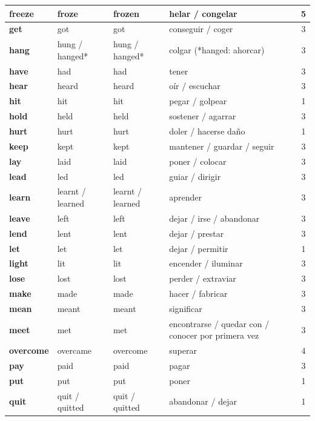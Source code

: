 \documentclass[11pt,a4paper]{article}
\begin{document}
\begin{longtable}{|>{\bfseries}p{2.6cm}|p{3.4cm}|p{3.6cm}|>{\raggedright\arraybackslash}p{6.0cm}|c|}
\rowcolor{rojoC} freeze & froze & frozen & helar / congelar & 5\\ \hline
\rowcolor{verdeC} get & got & got & conseguir / coger & 3\\ \hline
\rowcolor{verdeC} hang & hung / hanged* & hung / hanged* & colgar (*hanged: ahorcar) & 3\\ \hline
\rowcolor{verdeC} have & had & had & tener & 3\\ \hline
\rowcolor{verdeC} hear & heard & heard & oír / escuchar & 3\\ \hline
\rowcolor{amarilloC} hit & hit & hit & pegar / golpear & 1\\ \hline
\rowcolor{verdeC} hold & held & held & sostener / agarrar & 3\\ \hline
\rowcolor{amarilloC} hurt & hurt & hurt & doler / hacerse daño & 1\\ \hline
\rowcolor{verdeC} keep & kept & kept & mantener / guardar / seguir & 3\\ \hline
\rowcolor{verdeC} lay & laid & laid & poner / colocar & 3\\ \hline
\rowcolor{verdeC} lead & led & led & guiar / dirigir & 3\\ \hline
\rowcolor{verdeC} learn & learnt / learned & learnt / learned & aprender & 3\\ \hline
\rowcolor{verdeC} leave & left & left & dejar / irse / abandonar & 3\\ \hline
\rowcolor{verdeC} lend & lent & lent & dejar / prestar & 3\\ \hline
\rowcolor{amarilloC} let & let & let & dejar / permitir & 1\\ \hline
\rowcolor{verdeC} light & lit & lit & encender / iluminar & 3\\ \hline
\rowcolor{verdeC} lose & lost & lost & perder / extraviar & 3\\ \hline
\rowcolor{verdeC} make & made & made & hacer / fabricar & 3\\ \hline
\rowcolor{verdeC} mean & meant & meant & significar & 3\\ \hline
\rowcolor{verdeC} meet & met & met & encontrarse / quedar con / conocer por primera vez & 3\\ \hline
\rowcolor{moradoC} overcome & overcame & overcome & superar & 4\\ \hline
\rowcolor{verdeC} pay & paid & paid & pagar & 3\\ \hline
\rowcolor{amarilloC} put & put & put & poner & 1\\ \hline
\rowcolor{amarilloC} quit & quit / quitted & quit / quitted & abandonar / dejar & 1\\ \hline

\end{longtable}
\end{document}

